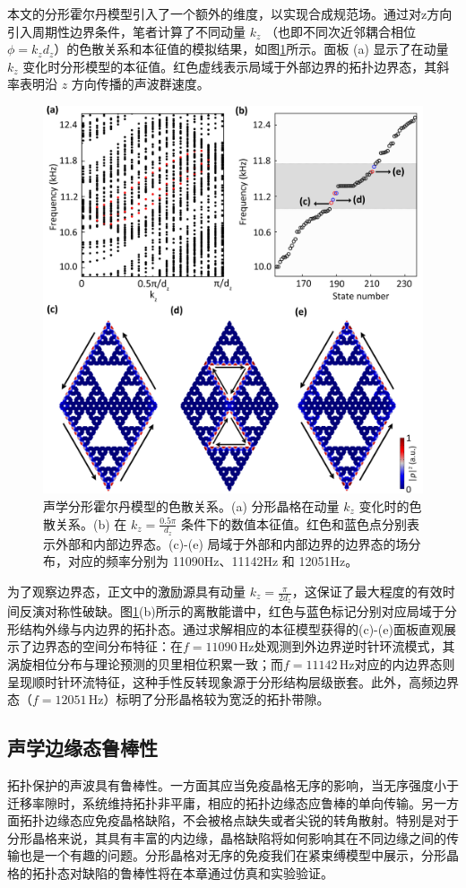 本文的分形霍尔丹模型引入了一个额外的维度，以实现合成规范场。通过对z方向引入周期性边界条件，笔者计算了不同动量 $k_z$ （也即不同次近邻耦合相位$\phi=k_zd_z$）的色散关系和本征值的模拟结果，如图\ref{fig:AcouFractSpec}所示。面板 (a) 显示了在动量 $k_z$ 变化时分形模型的本征值。红色虚线表示局域于外部边界的拓扑边界态，其斜率表明沿 $z$ 方向传播的声波群速度。

\begin{figure}[htbp]
    \centering
    \includegraphics[width=0.75\linewidth]{figure/FracHaldExp/AcouFractSpec.png}
    \caption{声学分形霍尔丹模型的色散关系。(a) 分形晶格在动量 $k_z$ 变化时的色散关系。(b) 在 $k_z = \frac{0.5\pi}{d_z}$ 条件下的数值本征值。红色和蓝色点分别表示外部和内部边界态。(c)-(e) 局域于外部和内部边界的边界态的场分布，对应的频率分别为 11090Hz、11142Hz 和 12051Hz。}
    \label{fig:AcouFractSpec}
\end{figure}

为了观察边界态，正文中的激励源具有动量 $k_z = \frac{\pi}{2d_z}$，这保证了最大程度的有效时间反演对称性破缺。图\ref{fig:AcouFractSpec}(b)所示的离散能谱中，红色与蓝色标记分别对应局域于分形结构外缘与内边界的拓扑态。通过求解相应的本征模型获得的(c)-(e)面板直观展示了边界态的空间分布特征：在$f=11090$\,Hz处观测到外边界逆时针环流模式，其涡旋相位分布与理论预测的贝里相位积累一致；而$f=11142$\,Hz对应的内边界态则呈现顺时针环流特征，这种手性反转现象源于分形结构层级嵌套。此外，高频边界态（$f=12051$\,Hz）标明了分形晶格较为宽泛的拓扑带隙。

\subsection{声学边缘态鲁棒性}
拓扑保护的声波具有鲁棒性。一方面其应当免疫晶格无序的影响，当无序强度小于迁移率隙时，系统维持拓扑非平庸，相应的拓扑边缘态应鲁棒的单向传输。另一方面拓扑边缘态应免疫晶格缺陷，不会被格点缺失或者尖锐的转角散射。特别是对于分形晶格来说，其具有丰富的内边缘，晶格缺陷将如何影响其在不同边缘之间的传输也是一个有趣的问题。分形晶格对无序的免疫我们在紧束缚模型中展示，分形晶格的拓扑态对缺陷的鲁棒性将在本章通过仿真和实验验证。

